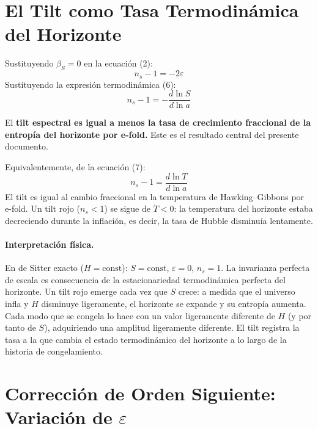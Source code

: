\documentclass[12pt,a4paper]{article}
\begin{document}
\section{El Tilt como Tasa Termodinámica del Horizonte}

Sustituyendo $\beta_S = 0$ en la ecuación (2):
\begin{equation}
n_s - 1 = -2\varepsilon \tag{12}
\end{equation}
Sustituyendo la expresión termodinámica (6):
\begin{equation}
\boxed{n_s - 1 = -\frac{d\ln S}{d\ln a}} \tag{13}
\end{equation}

El \textbf{tilt espectral es igual a menos la tasa de crecimiento fraccional de la entropía del horizonte por e-fold.} Este es el resultado central del presente documento.

Equivalentemente, de la ecuación (7):
\begin{equation}
n_s - 1 = \frac{d\ln T}{d\ln a} \tag{14}
\end{equation}
El tilt es igual al cambio fraccional en la temperatura de Hawking--Gibbons por e-fold. Un tilt rojo ($n_s < 1$) se sigue de $\dot{T} < 0$: la temperatura del horizonte estaba decreciendo durante la inflación, es decir, la tasa de Hubble disminuía lentamente.

\paragraph{Interpretación física.}
En de Sitter exacto ($H = \text{const}$): $S = \text{const}$, $\varepsilon = 0$, $n_s = 1$. La invarianza perfecta de escala es consecuencia de la estacionariedad termodinámica perfecta del horizonte. Un tilt rojo emerge cada vez que $S$ crece: a medida que el universo infla y $H$ disminuye ligeramente, el horizonte se expande y su entropía aumenta. Cada modo que se congela lo hace con un valor ligeramente diferente de $H$ (y por tanto de $S$), adquiriendo una amplitud ligeramente diferente. El tilt registra la tasa a la que cambia el estado termodinámico del horizonte a lo largo de la historia de congelamiento.

\section{Corrección de Orden Siguiente: Variación de $\varepsilon$}
\end{document}
